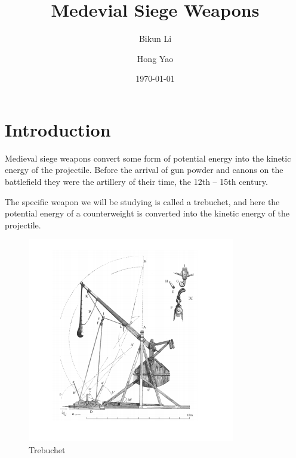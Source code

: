 \documentclass[%
reprint,
amsmath,amssymb,
aps,
]{revtex4-1}
\begin{document}
	
	
	\title{Medevial Siege Weapons}%
	
	
	\author{Bikun Li}
	
	\author{Hong Yao}%
	
	
	
	
	\date{\today}%
	
	
	\maketitle
	
	
	\section{\label{sec:level1}Introduction}
	
	Medieval siege weapons convert some form of potential energy into the kinetic energy of the
	projectile. Before the arrival of gun powder and canons on the battlefield they were the artillery
	of their time, the 12th – 15th century.
	
	The specific weapon we will be studying is called a trebuchet, and here the potential energy of
	a counterweight is converted into the kinetic energy of the projectile.
	\begin{figure}
		\centering
		\includegraphics[scale=0.8]{Intro.png}
		\caption{Trebuchet}
	\end{figure}
	\linebreak
\end{document}
